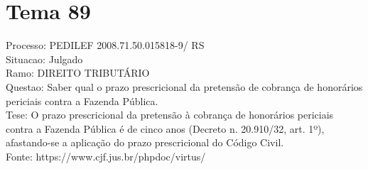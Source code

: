 \documentclass[12pt]{article}
\begin{document}
\section*{Tema 89}
Processo: PEDILEF 2008.71.50.015818-9/ RS\\
Situacao: Julgado\\
Ramo: DIREITO TRIBUTÁRIO\\
Questao: Saber qual o prazo prescricional da pretensão de cobrança de honorários periciais contra a Fazenda Pública.\\
Tese: O prazo prescricional da pretensão à cobrança de honorários periciais contra a Fazenda Pública é de cinco anos (Decreto n. 20.910/32, art. 1º), afastando-se a aplicação do prazo prescricional do Código Civil.\\
Fonte: https://www.cjf.jus.br/phpdoc/virtus/
\end{document}
